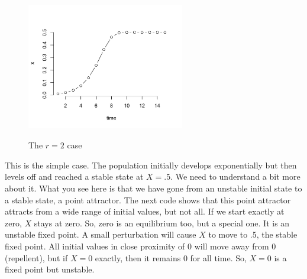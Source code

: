 \documentclass[
  letterpaper,
]{scrbook}
\begin{document}
\begin{figure}

{\centering \includegraphics[width=2.70472in,height=2.49606in]{media/ch2/image2.jpg}

}

\caption{\label{fig-ch2-img2}The \(r=2\) case}

\end{figure}

This is the simple case. The population initially develops exponentially
but then levels off and reached a stable state at \(X = .5\). We need to
understand a bit more about it. What you see here is that we have gone
from an unstable initial state to a stable state, a point attractor. The
next code shows that this point attractor attracts from a wide range of
initial values, but not all. If we start exactly at zero, \(X\) stays at
zero. So, zero is an equilibrium too, but a special one. It is an
unstable fixed point. A small perturbation will cause \(X\) to move to
.5, the stable fixed point. All initial values in close proximity of 0
will move away from 0 (repellent), but if \(X = 0\) exactly, then it
remains 0 for all time. So, \(X = 0\) is a fixed point but unstable.
\end{document}
